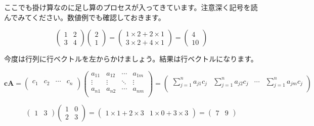 \documentclass{ltjsbook}
\begin{document}
ここでも掛け算なのに足し算のプロセスが入ってきています。注意深く記号を読んでみてください。数値例でも確認しておきます。

\begin{equation*}
    \begin{pmatrix}
        1 & 2 \\ 3 & 4
    \end{pmatrix}
    \begin{pmatrix}
        2 \\1
    \end{pmatrix}
    =
    \begin{pmatrix}
        1 \times 2 + 2 \times 1 \\
        3 \times 2 + 4 \times 1
    \end{pmatrix}
    =
    \begin{pmatrix}
        4 \\10
    \end{pmatrix}
\end{equation*}


今度は行列に行ベクトルを左からかけましょう。結果は行ベクトルになります。

\begin{equation*}
    \bm{c} \bm{A} =
    \begin{pmatrix}
        c_1 & c_2 & \cdots & c_n \\
    \end{pmatrix}
    \begin{pmatrix}
        a_{11} & a_{12} & \cdots & a_{1m} \\
        \vdots & \vdots & \ddots & \vdots \\
        a_{n1} & a_{n2} & \cdots & a_{nm} \\
    \end{pmatrix}
    =
    \begin{pmatrix}
        \displaystyle{\sum_{j=1}^{n}a_{j1}c_{j}} & \displaystyle{\sum_{j=1}^{n} a_{j2}c_{j}} & \cdots & \displaystyle{\sum_{j=1}^{n} a_{jm}c_{j}} \\
    \end{pmatrix}
\end{equation*}

\begin{equation*}
    \begin{pmatrix}
        1 & 3
    \end{pmatrix}
    \begin{pmatrix}
        1 & 0 \\
        2 & 3
    \end{pmatrix}
    =
    \begin{pmatrix}
        1 \times 1 + 2 \times 3 & 1\times 0+3 \times 3
    \end{pmatrix}
    =
    \begin{pmatrix}
        7 & 9
    \end{pmatrix}
\end{equation*}
\end{document}
